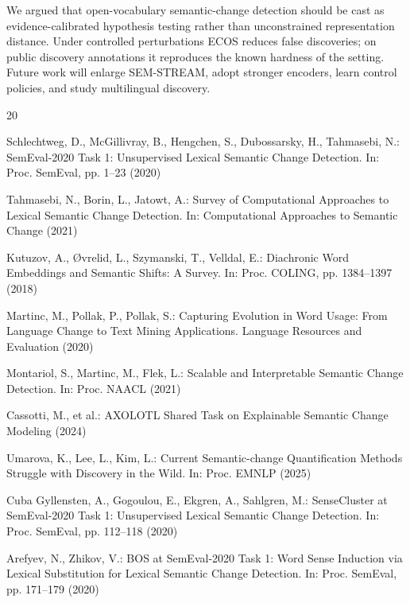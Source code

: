 \documentclass{llncs}
\begin{document}
We argued that open-vocabulary semantic-change detection should be cast as evidence-calibrated hypothesis testing rather than unconstrained representation distance.
Under controlled perturbations ECOS reduces false discoveries; on public discovery annotations it reproduces the known hardness of the setting.
Future work will enlarge SEM-STREAM, adopt stronger encoders, learn control policies, and study multilingual discovery.



\begin{thebibliography}{20}

Schlechtweg, D., McGillivray, B., Hengchen, S., Dubossarsky, H., Tahmasebi, N.: SemEval-2020 Task 1: Unsupervised Lexical Semantic Change Detection. In: Proc. SemEval, pp. 1--23 (2020)

Tahmasebi, N., Borin, L., Jatowt, A.: Survey of Computational Approaches to Lexical Semantic Change Detection. In: Computational Approaches to Semantic Change (2021)

Kutuzov, A., {\O}vrelid, L., Szymanski, T., Velldal, E.: Diachronic Word Embeddings and Semantic Shifts: A Survey. In: Proc. COLING, pp. 1384--1397 (2018)

Martinc, M., Pollak, P., Pollak, S.: Capturing Evolution in Word Usage: From Language Change to Text Mining Applications. Language Resources and Evaluation (2020)

Montariol, S., Martinc, M., Flek, L.: Scalable and Interpretable Semantic Change Detection. In: Proc. NAACL (2021)

Cassotti, M., et al.: AXOLOTL Shared Task on Explainable Semantic Change Modeling (2024)

Umarova, K., Lee, L., Kim, L.: Current Semantic-change Quantification Methods Struggle with Discovery in the Wild. In: Proc. EMNLP (2025)

Cuba Gyllensten, A., Gogoulou, E., Ekgren, A., Sahlgren, M.: SenseCluster at SemEval-2020 Task 1: Unsupervised Lexical Semantic Change Detection. In: Proc. SemEval, pp. 112--118 (2020)

Arefyev, N., Zhikov, V.: BOS at SemEval-2020 Task 1: Word Sense Induction via Lexical Substitution for Lexical Semantic Change Detection. In: Proc. SemEval, pp. 171--179 (2020)


\end{thebibliography}
\end{document}
